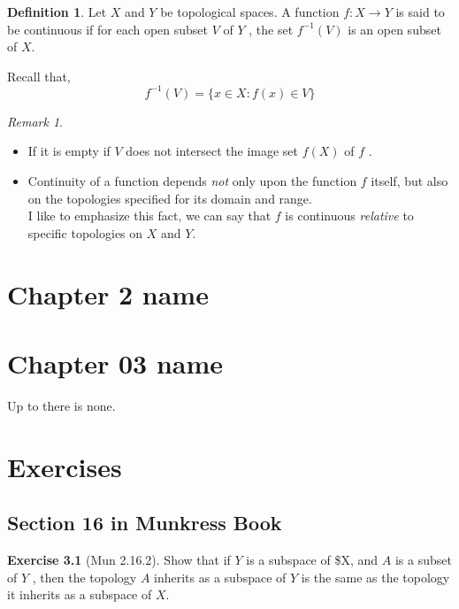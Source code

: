 \documentclass[
]{book}
\providecommand{\tightlist}{%
  \setlength{\itemsep}{0pt}\setlength{\parskip}{0pt}}
\theoremstyle{definition}
\newtheorem{definition}{Definition}[chapter]
\theoremstyle{definition}
\theoremstyle{definition}
\newtheorem{exercise}{Exercise}[chapter]
\theoremstyle{definition}
\theoremstyle{remark}
\newtheorem*{remark}{Remark}
\begin{document}
\begin{definition}
\protect\hypertarget{def:unnamed-chunk-87}{}\label{def:unnamed-chunk-87}Let \(X\) and \(Y\) be topological spaces. A function \(f : X \to Y\) is said to be continuous if for each open subset \(V\) of \(Y\) , the set \(f^{−1}(V)\) is an open subset of \(X\).
\end{definition}

Recall that,
\[f^{ −1}(V)=\{x\in X: f(x)\in V\}\]

\begin{remark}
\leavevmode

\begin{itemize}
\tightlist
\item
  If it is empty if \(V\) does not intersect the image set \(f (X)\) of \(f\) .
\item
  Continuity of a function depends \emph{not} only upon the function \(f\) itself, but also on the topologies specified for its domain and range.\\
  I like to emphasize this fact, we can say that \(f\) is continuous \emph{relative} to specific topologies on \(X\) and \(Y\).
\end{itemize}

\end{remark}

\hypertarget{chapter-2-name}{%
\chapter{Chapter 2 name}\label{chapter-2-name}}

\hypertarget{chapter-03-name}{%
\chapter{Chapter 03 name}\label{chapter-03-name}}

Up to there is none.

\hypertarget{exercises}{%
\chapter{Exercises}\label{exercises}}

\hypertarget{section-16-in-munkress-book}{%
\section{Section 16 in Munkress Book}\label{section-16-in-munkress-book}}

\begin{exercise}[Mun 2.16.2]
\protect\hypertarget{exr:unnamed-chunk-89}{}\label{exr:unnamed-chunk-89}Show that if \(Y\) is a subspace of \$X, and \(A\) is a subset of \(Y\) , then the topology \(A\) inherits as a subspace of \(Y\) is the same as the topology it inherits as a subspace of \(X\).
\end{exercise}
\end{document}
